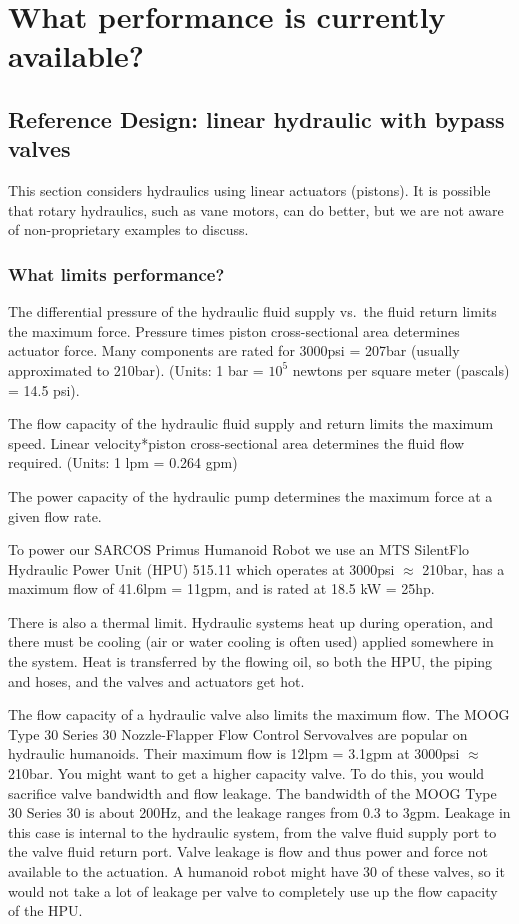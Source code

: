 \documentclass[letterpaper,12pt,fullpage]{article}
\begin{document}
\section{What performance is currently available?}

\subsection{Reference Design: linear hydraulic with bypass valves}

This section considers hydraulics using linear actuators (pistons).
It is possible that rotary hydraulics, such as vane motors,
can do better, but we are not aware of non-proprietary examples
to discuss.

\subsubsection{What limits performance?}

The differential pressure of the hydraulic fluid supply vs.\ the fluid
return limits the maximum force. Pressure times piston cross-sectional area
determines actuator force.
Many components are rated for 3000psi = 207bar (usually approximated to
210bar).
(Units: 1 bar = $10^5$ newtons per square meter (pascals) = 14.5 psi).

The flow capacity of the hydraulic fluid supply and return limits
the maximum speed. Linear velocity*piston cross-sectional area determines 
the fluid flow required.
(Units: 1 lpm = 0.264 gpm)

The power capacity of the hydraulic pump determines the maximum force
at a given flow rate.

To power our SARCOS Primus Humanoid Robot we use an
MTS SilentFlo Hydraulic Power Unit (HPU) 515.11
which operates at 3000psi $\approx$ 210bar,
has a maximum flow of 41.6lpm = 11gpm, and is rated at
18.5 kW = 25hp.

There is also a thermal limit. Hydraulic systems heat up during operation,
and there must be cooling (air or water cooling is often used)
applied somewhere in the system. Heat is transferred by the flowing oil,
so both the HPU, the piping and hoses, and the valves and actuators get hot.

The flow capacity of a hydraulic valve also limits the maximum flow.
The MOOG Type 30 Series 30 Nozzle-Flapper Flow Control Servovalves
are popular on hydraulic humanoids. Their maximum flow is
12lpm = 3.1gpm at 3000psi $\approx$ 210bar.
You might want to get a higher capacity valve. To do this, you
would sacrifice valve bandwidth and flow leakage.
The bandwidth of the MOOG Type 30
Series 30 is about 200Hz, and the leakage ranges from
0.3 to 3gpm. Leakage in this case is internal to the hydraulic
system, from the valve fluid supply port to the valve fluid return port.
Valve leakage is flow and thus power and force
not available to the actuation.
A humanoid robot might have 30 of these valves,
so it would not take a lot of leakage per valve to completely
use up the flow capacity of the HPU.
\end{document}
